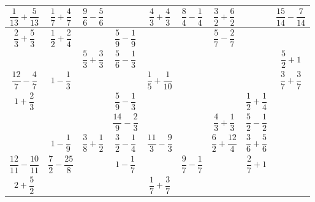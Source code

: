 \begin{enigme}[Sudofractions]
\begin{center}
{\begin{tabular}{|*{3}{C{0.9}|}|*{3}{C{0.9}|}|*{3}{C{0.9}|}}
         \hline
          \!$\dfrac1{13}+\dfrac5{13}$\! & $\dfrac17+\dfrac47$ & $\dfrac96-\dfrac56$ & & $\dfrac43+\dfrac43$ & $\dfrac84-\dfrac14$ & $\dfrac32+\dfrac62$ & & \!$\dfrac{15}{14}-\dfrac{7}{14}\!$ \\
         \hline
          $\dfrac23+\dfrac53$ & $\dfrac12+\dfrac24$ & & $\dfrac59-\dfrac19$ & & & $\dfrac57-\dfrac27$ & & \\
         \hline
          & & $\dfrac53+\dfrac33$ & $\dfrac56-\dfrac13$ & & & & & $\dfrac52+1$\\
          \hline
          \hline
          $\dfrac{12}7-\dfrac47$ & $1-\dfrac13$ & & & $\dfrac15+\dfrac{1}{10}$ & & & & $\dfrac37+\dfrac37$ \\
         \hline
          $1+\dfrac23$ & & & $\dfrac59-\dfrac13$ & & & & $\dfrac12+\dfrac14$ & \\
         \hline
          & & & $\dfrac{14}{9}-\dfrac23$ & & & $\dfrac43+\dfrac13$ & $\dfrac52-\dfrac12$ & \\
         \hline
         \hline
          & $1-\dfrac19$ & $\dfrac38+\dfrac12$ & $\dfrac32-\dfrac14$ & $\dfrac{11}3-\dfrac93$ & & $\dfrac62+\dfrac{12}4$ & $\dfrac36+\dfrac56$ & \\
         \hline
          \!$\dfrac{12}{11}-\dfrac{10}{11}$\! & $\dfrac72-\dfrac{25}{8}$ &  & $1-\dfrac17$ & & $\dfrac97-\dfrac17$ & & $\dfrac27+1$ & \\
         \hline
          $2+\dfrac52$ & & & & $\dfrac17+\dfrac37$ & & & & \\
         \hline
      \end{tabular}}
   \end{center}
\end{enigme}

